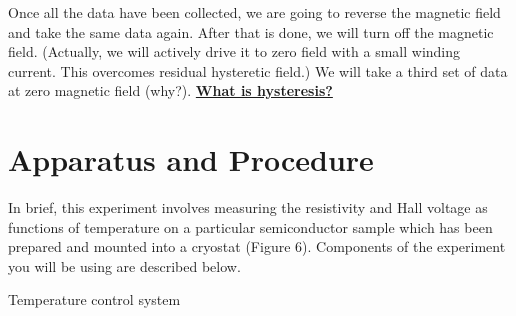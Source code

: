 \documentclass{../lab}
\begin{document}
Once all the data have been collected, we are going to reverse the magnetic field and take the same data again. After that is done, we will turn off the magnetic field. (Actually, we will actively drive it to zero field with a small winding current. This overcomes residual hysteretic field.) We will take a third set of data at zero magnetic field (why?). \href{http://experimentationlab.berkeley.edu/hysteresis}{\textbf{What is hysteresis?}}

\section{Apparatus and Procedure}

In brief, this experiment involves measuring the resistivity and Hall voltage as functions of temperature on a particular semiconductor sample which has been prepared and mounted into a cryostat (Figure 6). Components of the experiment you will be using are described below.

Temperature control system
\end{document}
